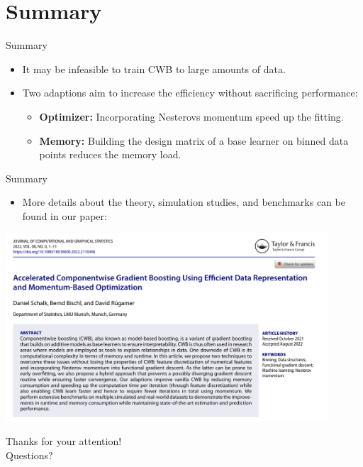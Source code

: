 \documentclass[ignorenonframetext,]{beamer}
\providecommand{\tightlist}{%
  \setlength{\itemsep}{0pt}\setlength{\parskip}{0pt}}
\begin{document}
\hypertarget{summary}{%
\section{Summary}\label{summary}}

\begin{frame}{Summary}
\protect\hypertarget{summary-1}{}
\begin{itemize}
\tightlist
\item
  It may be infeasible to train CWB to large amounts of data.
\item
  Two adaptions aim to increase the efficiency without sacrificing
  performance:

  \begin{itemize}
  \tightlist
  \item
    \textbf{Optimizer:} Incorporating Nesterovs momentum speed up the
    fitting.
  \item
    \textbf{Memory:} Building the design matrix of a base learner on
    binned data points reduces the memory load.
  \end{itemize}
\end{itemize}
\end{frame}

\begin{frame}{Summary}
\protect\hypertarget{summary-2}{}
\begin{itemize}
\tightlist
\item
  More details about the theory, simulation studies, and benchmarks can
  be found in our paper:
\end{itemize}

{\centering\hspace{0.5cm}\includegraphics[width=0.9\textwidth]{figures/cacb-paper.png}}
\end{frame}

\begin{frame}[plain]{}
\protect\hypertarget{section}{}
\begin{center}
\Large{Thanks for your attention!} \\
\Large{Questions?}
\end{center}
\end{frame}

\begin{frame}{}
\protect\hypertarget{section-1}{}
\footnotesize


\end{frame}
\end{document}
